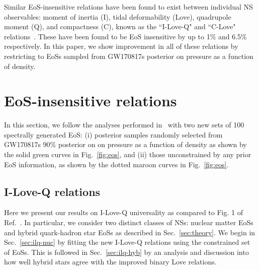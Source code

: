 \documentclass[prd,twocolumn,nofootinbib,superscriptaddress,amsmath,amssymb]{revtex4-1}
\begin{document}
Similar EoS-insensitive relations have been found to exist between individual NS observables: moment of inertia (I), tidal deformability (Love), quadrupole moment (Q), and compactness (C), known as the ``I-Love-Q" and ``C-Love" relations~\cite{Yagi:ILQ, Yagi:binLove}.
These have been found to be EoS insensitive by up to 1\% and 6.5\% respectively.
In this paper, we show improvement in all of these relations by restricting to EoSs sampled from GW170817s posterior on pressure as a function of density.
\section{EoS-insensitive relations}\label{sec:universal}
In this section, we follow the analyses performed in~\cite{Yagi:binLove,Yagi:ILQ} with two new sets of 100 spectrally generated EoS: (i) posterior samples randomly selected from GW170817s 90\% posterior on on pressure as a function of density as shown by the solid green curves in Fig.~\ref{fig:eos}, and (ii) those unconstrained by any prior EoS information, as shown by the dotted maroon curves in Fig.~\ref{fig:eos}.

\subsection{I-Love-Q relations}\label{sec:ilq}
Here we present our results on I-Love-Q universality as compared to Fig. 1 of Ref.~\cite{Yagi:ILQ}.
In particular, we consider two distinct classes of NSs: nuclear matter EoSs and hybrid quark-hadron star EoSs as described in Sec.~\ref{sec:theory}.
We begin in Sec.~\ref{sec:ilq-nuc} by fitting the new I-Love-Q relations using the constrained set of EoSs.
This is followed in Sec.~\ref{sec:ilq-hyb} by an analysis and discussion into how well hybrid stars agree with the improved binary Love relations. 
\end{document}
